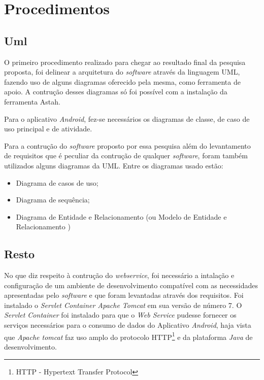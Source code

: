 \section{Procedimentos}
	
	\subsection{Uml}
	
			\par O primeiro procedimento realizado para chegar ao resultado final 
		da pesquisa proposta, foi delinear a arquitetura do \textit{software} através
		da linguagem UML, fazendo uso de alguns diagramas oferecido pela mesma, como
		ferramenta de apoio. A contrução desses diagramas só foi possível com a
		instalação da ferramenta Astah.
			
			\par Para o aplicativo \textit{Android}, fez-se necessários os diagramas de
		classe, de caso de uso principal e de atividade.
		
			\par Para a contrução do \textit{software} proposto por essa pesquisa além do
		levantamento de requisitos que é peculiar da contrução de qualquer
		\textit{software}, foram também utilizados alguns diagramas da UML. Entre os
		diagramas usado estão:
			\begin{itemize}
			  
			  \item Diagrama de casos de uso;
			  
			  \item Diagrama de sequência;
			  
			  \item Diagrama de Entidade e Relacionamento (ou Modelo de Entidade e
			  Relacionamento )
			
			\end{itemize}
	
	
	\subsection{Resto}
	
	
		\par No que diz respeito à contrução do \textit{webservice}, foi necessário a
	intalação e configuração de um ambiente de desenvolvimento compatível com as
	necessidades apresentadas pelo \textit{software} e que foram levantadas
	através dos requisitos. Foi instalado o \textit{Servlet Container Apache
	Tomcat} em sua versão de número 7. O \textit{Servlet Container} foi instalado
	para que o \textit{Web Service} pudesse fornecer os serviços necessários para
	o consumo de dados do Aplicativo \textit{Android}, haja vista que
	\textit{Apache tomcat} faz uso amplo do protocolo HTTP\footnote{HTTP -
	Hypertext Transfer Protocol} e da plataforma \textit{Java} de desenvolvimento.
			
